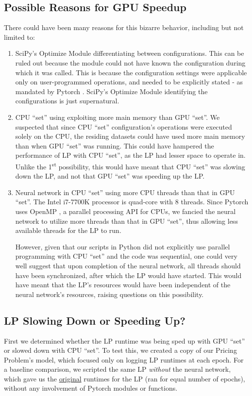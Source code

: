 \begin{appendices}
    \subsection{Possible Reasons for GPU Speedup} \label{sec:Possible Reasons for GPU Speedup}
    There could have been many reasons for this bizarre behavior, including but not limited to:
    \begin{enumerate}
        \item SciPy's Optimize Module differentiating between configurations. This can be ruled out because the module could not have known the configuration during which it was called. This is because the configuration settings were applicable only on user-programmed operations, and needed to be explicitly stated - as mandated by Pytorch \cite{PTDocs}. SciPy's Optimize Module identifying the configurations is just supernatural.
        \item CPU ``set'' using exploiting more main memory than GPU ``set''. We suspected that since CPU ``set'' configuration's operations were executed solely on the CPU, the residing datasets could have used more main memory than when GPU ``set'' was running. This could have hampered the performance of LP with CPU ``set'', as the LP had lesser space to operate in. Unlike the 1\textsuperscript{st} possibility, this would have meant that CPU ``set'' was slowing down the LP, and not that GPU ``set'' was speeding up the LP.
        \item Neural network in CPU ``set'' using more CPU threads than that in GPU ``set''. The Intel i7-7700K processor is quad-core with 8 threads. Since Pytorch uses OpenMP \cite{PTDocs}, a parallel processing API for CPUs, we fancied the neural network to utilize more threads than that in GPU ``set'', thus allowing less available threads for the LP to run. 
        
        However, given that our scripts in Python did not explicitly use parallel programming with CPU ``set'' and the code was sequential, one could very well suggest that upon completion of the neural network, all threads should have been synchronized, after which the LP would have started. This would have meant that the LP's resources would have been independent of the neural network's resources, raising questions on this possibility.
    \end{enumerate}

    \subsection{LP Slowing Down or Speeding Up?} \label{sec:LP Slowing Down or Speeding Up?}
    First we determined whether the LP runtime was being sped up with GPU ``set'' or slowed down with CPU ``set''. To test this, we created a copy of our Pricing Problem's model, which focused only on logging LP runtimes at each epoch. For a baseline comparison, we scripted the same LP \textit{without} the neural network, which gave us the \underline{original} runtimes for the LP (ran for equal number of epochs), without any involvement of Pytorch modules or functions. 
    

\end{appendices}
